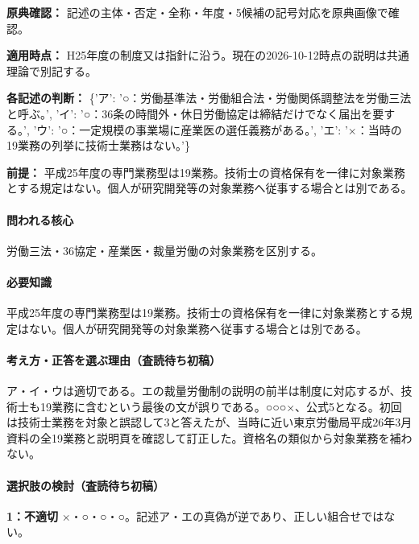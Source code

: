 \noindent\textbf{原典確認：} 記述の主体・否定・全称・年度・5候補の記号対応を原典画像で確認。\par

\noindent\textbf{適用時点：} H25年度の制度又は指針に沿う。現在の2026-10-12時点の説明は共通理論で別記する。\par

\noindent\textbf{各記述の判断：} \{'ア': '○：労働基準法・労働組合法・労働関係調整法を労働三法と呼ぶ。', 'イ': '○：36条の時間外・休日労働協定は締結だけでなく届出を要する。', 'ウ': '○：一定規模の事業場に産業医の選任義務がある。', 'エ': '×：当時の19業務の列挙に技術士業務はない。'\}\par

\noindent\textbf{前提：} 平成25年度の専門業務型は19業務。技術士の資格保有を一律に対象業務とする規定はない。個人が研究開発等の対象業務へ従事する場合とは別である。\par

\paragraph{問われる核心} 労働三法・36協定・産業医・裁量労働の対象業務を区別する。

\paragraph{必要知識} 平成25年度の専門業務型は19業務。技術士の資格保有を一律に対象業務とする規定はない。個人が研究開発等の対象業務へ従事する場合とは別である。

\paragraph{考え方・正答を選ぶ理由（査読待ち初稿）} ア・イ・ウは適切である。エの裁量労働制の説明の前半は制度に対応するが、技術士も19業務に含むという最後の文が誤りである。○○○×、公式5となる。初回は技術士業務を対象と誤認して3と答えたが、当時に近い東京労働局平成26年3月資料の全19業務と説明頁を確認して訂正した。資格名の類似から対象業務を補わない。

\paragraph{選択肢の検討（査読待ち初稿）}\mbox{}\par

\noindent\textbf{1：不適切} ×・○・○・○。記述ア・エの真偽が逆であり、正しい組合せではない。\par

